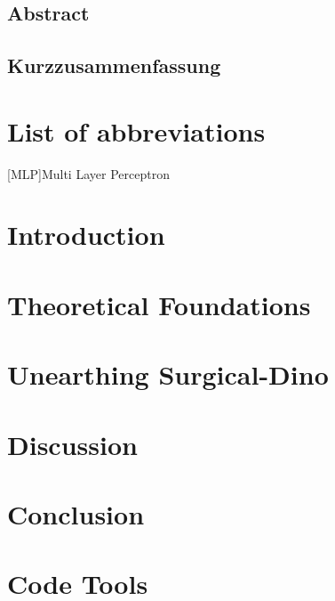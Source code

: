 \documentclass[12pt, twoside]{report_bachelorarbeit}
\renewcommand{\headrulewidth}{0.4pt}%
\renewcommand{\footrulewidth}{0.4pt}%
\renewcommand{\headrulewidth}{0.4pt}
\renewcommand{\footrulewidth}{0.4pt}
\begin{document}
\pagestyle{plain}

\section*{Abstract}

\newpage
\section*{Kurzzusammenfassung}

\newpage
%


\tableofcontents
\listoffigures
\listoftables

\chapter*{List of abbreviations}
\begin{acronym}
[MLP]{Multi Layer Perceptron}
\end{acronym}

\pagestyle{fancy}
\setlength{\headheight}{14.5pt}
\fancyhead{}
\fancyfoot{}
\fancyfoot[LE,RO]{\thepage}
\renewcommand{\headrulewidth}{0.4pt}
\renewcommand{\footrulewidth}{0.4pt}

\chapter{Introduction}
\setcounter{page}{1}

\chapter{Theoretical Foundations}

\chapter{Unearthing Surgical-Dino}

\chapter{Discussion}

\chapter{Conclusion}

\appendix

\chapter{Code Tools}
\label{app:codetools}
\clearpage
\pagestyle{plain}
\printbibliography

\newpage
%
\end{document}
